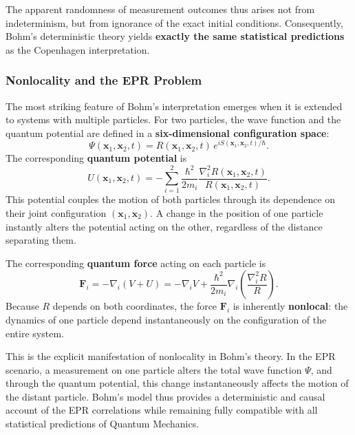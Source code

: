 The apparent randomness of measurement outcomes thus arises not from indeterminism, but from ignorance of the exact initial conditions.  
Consequently, Bohm’s deterministic theory yields \textbf{exactly the same statistical predictions} as the Copenhagen interpretation.

\subsubsection{Nonlocality and the EPR Problem}

The most striking feature of Bohm’s interpretation emerges when it is extended to systems with multiple particles.  
For two particles, the wave function and the quantum potential are defined in a \textbf{six-dimensional configuration space}:
\begin{equation}
\Psi(\mathbf{x}_1,\mathbf{x}_2,t)
= R(\mathbf{x}_1,\mathbf{x}_2,t)\,
  e^{iS(\mathbf{x}_1,\mathbf{x}_2,t)/\hbar}.
\end{equation}
The corresponding \textbf{quantum potential} is
\begin{equation}
U(\mathbf{x}_1,\mathbf{x}_2,t)
= -\sum_{i=1}^{2}
\frac{\hbar^2}{2m_i}
\frac{\nabla_i^2 R(\mathbf{x}_1,\mathbf{x}_2,t)}
     {R(\mathbf{x}_1,\mathbf{x}_2,t)}.
\end{equation}
This potential couples the motion of both particles through its dependence on their joint configuration $(\mathbf{x}_1,\mathbf{x}_2)$.  
A change in the position of one particle instantly alters the potential acting on the other, regardless of the distance separating them.

The corresponding \textbf{quantum force} acting on each particle is
\begin{equation}
\mathbf{F}_i = -\nabla_i (V + U)
= -\nabla_i V
+ \frac{\hbar^2}{2m_i}
\nabla_i \!\left( \frac{\nabla_i^2 R}{R} \right).
\end{equation}
Because $R$ depends on both coordinates, the force $\mathbf{F}_i$ is inherently \textbf{nonlocal}: the dynamics of one particle depend instantaneously on the configuration of the entire system.

This is the explicit manifestation of nonlocality in Bohm’s theory.  
In the EPR scenario, a measurement on one particle alters the total wave function $\Psi$, and through the quantum potential, this change instantaneously affects the motion of the distant particle.  
Bohm’s model thus provides a deterministic and causal account of the EPR correlations while remaining fully compatible with all statistical predictions of Quantum Mechanics.

